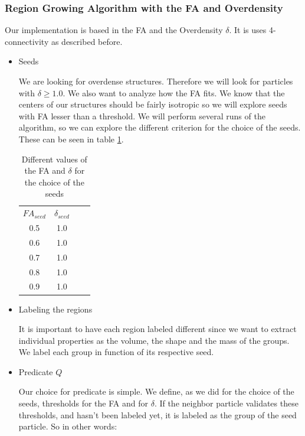\documentclass[12pt]{article}
\begin{document}
\subsubsection{Region Growing Algorithm with the FA and Overdensity}\label{sec:own_impl_descr}
Our implementation is based in the FA and the Overdensity $\delta$. It is uses 4-connectivity as described before.
\begin{itemize}
    \item Seeds
\begin{par}
We are looking for overdense structures. Therefore we will look
for particles with $\delta \geq 1.0$.  We also want to analyze how
the FA fits. We know that the centers of our structures should be
fairly isotropic so we will explore seeds with FA lesser than a
threshold. We will perform several runs of the algorithm, so we
can explore the different criterion for the choice of the seeds.
These can be seen in table \ref{tab:seeds_FA_Trace}. 
\end{par}
 \begin{table}[ht]
    \centering
    \begin{tabular}{|c|c|c|c|}
        $FA_{seed}$ & $\delta_{seed}$ \\
        0.5 &  1.0 \\
        0.6 &  1.0 \\
        0.7 &  1.0 \\
        0.8 &  1.0 \\
        0.9 &  1.0 \\
    \end{tabular}
    \caption{Different values of the FA and $\delta$ for the choice of the seeds}
    \label{tab:seeds_FA_Trace}
\end{table}
\FloatBarrier

\item Labeling the regions
\begin{par}
It is important to have each region labeled different since we
want to extract individual properties as the volume, the shape and
the mass of the groups. We label each group in function of its
respective seed.
\end{par}

\item Predicate $Q$

\begin{par}
Our choice for predicate is simple. We define, as we did for the
choice of the seeds, thresholds for the FA and for $\delta$. If
the neighbor particle validates these thresholds, and hasn't been
labeled yet, it is labeled as the group of the seed particle. So
in other words: \\


\end{par}
\end{itemize}
\end{document}
